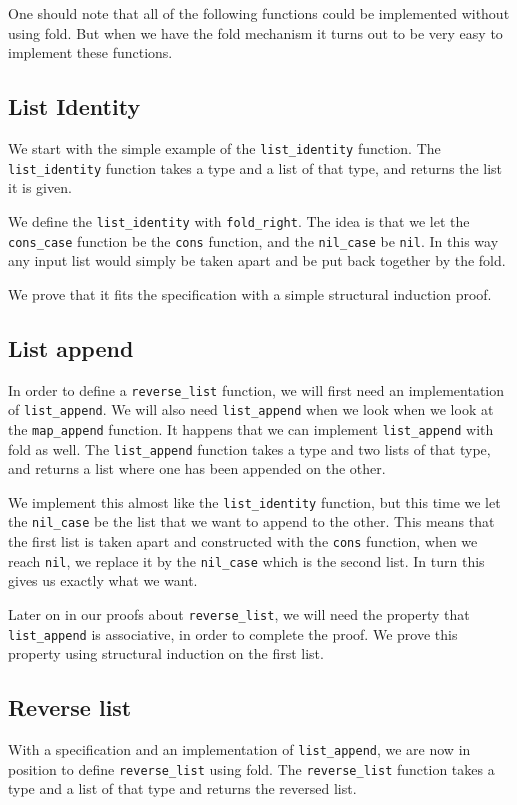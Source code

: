 \documentclass[a4paper]{article}
\begin{document}
One should note that all of the following functions could be implemented without
using fold. But when we have the fold mechanism it turns out to be very easy to
implement these functions.

\subsection{List Identity}
We start with the simple example of the \texttt{list\_identity} function. The
\linebreak\texttt{list\_identity} function takes a type and a list of that
type, and returns the list it is given.

We define the \texttt{list\_identity} with \texttt{fold\_right}. The idea is
that we let the \texttt{cons\_case} function be the \texttt{cons} function, and
the \texttt{nil\_case} be \texttt{nil}. In this way any input list would simply
be taken apart and be put back together by the fold.

We prove that it fits the specification with a simple structural induction
proof.

\subsection{List append}
In order to define a \texttt{reverse\_list} function, we will first need an
implementation of \texttt{list\_append}. We will also need
\texttt{list\_append} when we look when we look at the \texttt{map\_append}
function. It happens that we can implement \texttt{list\_append} with fold as
well. The \texttt{list\_append} function takes a type and two lists of that
type, and returns a list where one has been appended on the other.

We implement this almost like the \texttt{list\_identity} function, but this
time we let the \texttt{nil\_case} be the list that we want to append to the
other. This means that the first list is taken apart and constructed with the
\texttt{cons} function, when we reach \texttt{nil}, we replace it by the
\texttt{nil\_case} which is the second list. In turn this gives us exactly what
we want.

Later on in our proofs about \texttt{reverse\_list}, we will need the property
that \texttt{list\_append} is associative, in order to complete the proof. We
prove this property using structural induction on the first list.

\subsection{Reverse list}
With a specification and an implementation of \texttt{list\_append}, we are now
in position to define \texttt{reverse\_list} using fold. The
\texttt{reverse\_list} function takes a type and a list of that type and
returns the reversed list.
\end{document}
